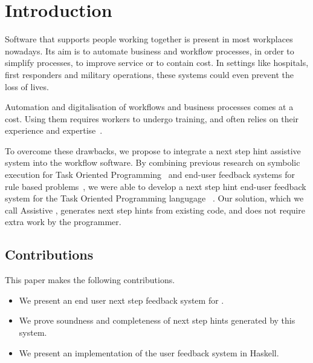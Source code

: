 
\section{Introduction}
\label{sec:intro}

Software that supports people working together is present in most workplaces nowadays.
Its aim is to automate business and workflow processes, in order to simplify processes, to improve service or to contain cost.
In settings like hospitals, first responders and military operations, these systems could even prevent the loss of lives.


Automation and digitalisation of workflows and business processes comes at a cost.
Using them requires workers to undergo training, and often relies on their experience and expertise~\cite{}.

To overcome these drawbacks, we propose to integrate a next step hint assistive system into the workflow software.
By combining previous research on symbolic execution for Task Oriented Programming~\cite{Naus2019} and end-user feedback systems for rule based problems~\cite{DBLP:conf/sfp/NausJ16},
we were able to develop a next step hint end-user feedback system for the Task Oriented Programming langugage \TOPHAT~\cite{Steenvoorden2019}.
Our solution, which we call Assistive \TOPHAT, generates next step hints from existing code, and does not require extra work by the programmer.



\subsection{Contributions}

This paper makes the following contributions.

\begin{itemize}
  \item We present an end user next step feedback system for \TOPHAT.
  \item We prove soundness and completeness of next step hints generated by this system.
  \item We present an implementation of the user feedback system in Haskell.
\end{itemize}


